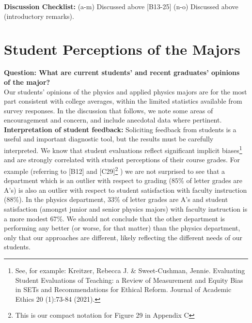 \documentclass[12pt]{article}
\begin{document}
\noindent
{\bf Discussion Checklist:} (a-m) Discussed above [B13-25] (n-o)
Discussed above (introductory remarks).

\newpage
\section{Student Perceptions of the Majors}
\label{sec:perceptions}

{\bf Question: What are current students' and recent graduates'
  opinions of the major? }\\
  
\noindent
Our students' opinions of the physics and applied physics majors are
for the most part consistent with college averages, within the limited
statistics available from survey responses.  In the discussion that
follows, we note some areas of encouragement and concern, and include
anecdotal data where pertinent.\\[3pt]

\noindent
{\bf Interpretation of student feedback:} Soliciting feedback from
students is a useful and important diagnostic tool, but the results
must be carefully interpreted.  We know that student evaluations
reflect significant implicit biases\footnote{See, for example:
  Kreitzer, Rebecca J. \& Sweet-Cushman, Jennie. Evaluating Student
  Evaluations of Teaching: a Review of Measurement and Equity Bias in
  SETs and Recommendations for Ethical Reform. Journal of Academic
  Ethics 20 (1):73-84 (2021).}  and are strongly correlated with
student perceptions of their course grades.  For example (referring
to [B12] and [C29]\footnote{This is our compact notation for Figure 29 in Appendix C} 
 ) we are not surprised to see that a department which
is an outlier with respect to grading ($85\%$ of letter grades are
A's) is also an outlier with respect to student satisfaction with
faculty instruction ($88\%$).  In the physics department, $33\%$ of
letter grades are A's and student satisfaction (amongst junior and
senior physics majors) with faculty instruction is a more modest
$67\%$.  We should not conclude that the other department is
performing any better (or worse, for that matter) than the physics
department, only that our approaches are different, likely reflecting
the different needs of our students.\\[3pt]
\end{document}
